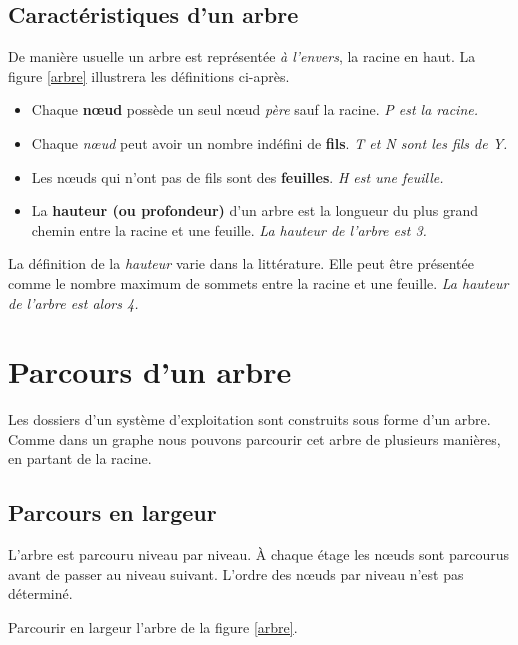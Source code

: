 \documentclass[a4paper,11pt]{article}
\begin{document}
\begin{Form}
\subsection{Caractéristiques d'un arbre}
De manière usuelle un arbre est représentée \emph{à l'envers}, la racine en haut. La figure \ref{arbre} illustrera les définitions ci-après.
\begin{itemize}
\item Chaque \textbf{nœud} possède un seul nœud \emph{père} sauf la racine. \emph{P est la racine.}
\item Chaque \emph{nœud} peut avoir un nombre indéfini de \textbf{fils}. \emph{T et N sont les fils de Y.}
\item Les nœuds qui n'ont pas de fils sont des \textbf{feuilles}. \emph{H est une feuille.}
\item La \textbf{hauteur (ou profondeur)} d'un arbre est la longueur du plus grand chemin entre la racine et une feuille. \emph{La hauteur de l'arbre est 3.}
\end{itemize}
\begin{aretenir}[Remarque]
La définition de la \emph{hauteur} varie dans la littérature. Elle peut être présentée comme le nombre maximum de sommets entre la racine et une feuille. \emph{La hauteur de l'arbre est alors 4.}
\end{aretenir}
\begin{center}
\label{arbre}
\end{center}
\section{Parcours d'un arbre}
Les dossiers d'un système d'exploitation sont construits sous forme d'un arbre. Comme dans un graphe nous pouvons parcourir cet arbre de plusieurs manières, en partant de la racine.
\subsection{Parcours en largeur}
L'arbre est parcouru niveau par niveau. À chaque étage les nœuds sont parcourus avant de passer au niveau suivant. L'ordre des nœuds par niveau n'est pas déterminé.
\begin{activite}
Parcourir en largeur l'arbre de la figure \ref{arbre}.
\end{activite}

\end{Form}
\end{document}
